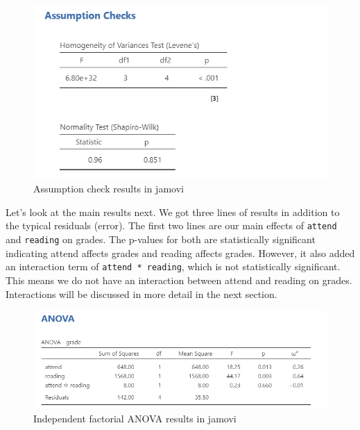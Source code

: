 \documentclass[
]{book}
\begin{document}
\begin{figure}

{\centering \includegraphics[width=1\linewidth]{images/06-factorial-anova/independent-factorial_assumptions} 

}

\caption{Assumption check results in jamovi}\label{fig:unnamed-chunk-1}
\end{figure}

Let's look at the main results next. We got three lines of results in addition to the typical residuals (error). The first two lines are our main effects of \texttt{attend} and \texttt{reading} on grades. The p-values for both are statistically significant indicating attend affects grades and reading affects grades. However, it also added an interaction term of \texttt{attend\ *\ reading}, which is not statistically significant. This means we do not have an interaction between attend and reading on grades. Interactions will be discussed in more detail in the next section.

\begin{figure}

{\centering \includegraphics[width=1\linewidth]{images/06-factorial-anova/independent-factorial_results} 

}

\caption{Independent factorial ANOVA results in jamovi}\label{fig:unnamed-chunk-2}
\end{figure}
\end{document}
